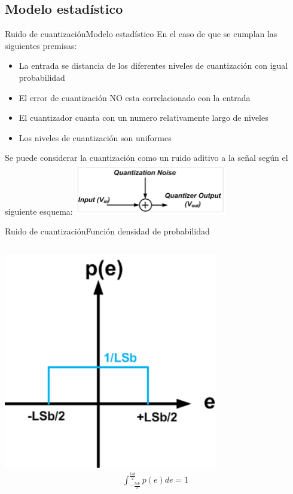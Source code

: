  \subsection{Modelo estadístico}
 \begin{frame}{Ruido de cuantización}{Modelo estadístico}
    En el caso de que se cumplan las siguientes premisas:
    \begin{itemize}
       \item La entrada se distancia de los diferentes niveles de cuantización con igual probabilidad
       \item El error de cuantización NO esta correlacionado con la entrada
       \item El cuantizador cuanta con un numero relativamente largo de niveles
       \item Los niveles de cuantización son uniformes
    \end{itemize}
    Se puede considerar la cuantización como un ruido aditivo a la señal según el siguiente esquema:
    \center\includegraphics[width=0.5\textwidth]{1_clase/noise_model}
    \vfill
 \end{frame}
 \begin{frame}{Ruido de cuantización}{Función densidad de probabilidad}
    \begin{columns}[onlytextwidth]
       \center\includegraphics[width=0.7\textwidth]{1_clase/noise_funcion_probabilidad}
       \begin{align*}
          \int^\frac{lsb}{2}_{-\frac{lsb}{2}} p(e) de = 1 \\
       \end{align*}
    \end{columns}
    \vfill
 \end{frame}
